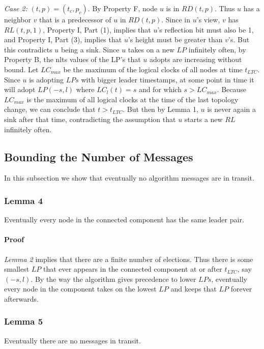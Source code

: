 \documentclass{article}
\begin{document}
\textit{Case 2:}
$(t, p) = (t_c, p_c)$. By Property F, node $u$ is in $RD(t, p)$. Thus $u$ has a neighbor $v$ that is a predecessor of $u$ in $RD(t, p)$. Since in $u$’s view, $v$ has $RL(t, p, 1)$, Property I, Part (1), implies that $u$’s reflection bit must also be 1, and Property I, Part (3), implies that $u$’s height must be greater than $v$’s. But this contradicts $u$ being a sink. Since $u$ takes on a new $LP$ infinitely often, by Property
B, the nlts values of the LP’s that $u$ adopts are increasing without bound. Let $LC_{max}$ be the maximum of the logical clocks of all nodes at time $t_{LTC}$. Since $u$ is adopting $LPs$ with bigger leader timestamps, at some point in time it will adopt $LP(−s, l)$ where $LC_l(t) = s$ and for which $s > LC_{max}$.
Because $LC_{max}$ is the maximum of all logical clocks at the time of the last topology change, we can conclude that $t > t_{LTC}$. But then by Lemma 1, $u$ is never again a sink after that time, contradicting the assumption that $u$ starts a new $RL$ infinitely often.

\subsection{Bounding the Number of Messages}
In this subsection we show that eventually no algorithm messages are in transit.

\subsubsection{Lemma 4}
Eventually every node in the connected component has the same leader pair.

\paragraph{Proof}
\textit{Lemma 2} implies that there are a finite number of elections. Thus there is some smallest $LP$ that ever appears in the connected component at or after $t_{LTC}$, say $(−s, l)$.
By the way the algorithm gives precedence to lower $LPs$, eventually every node in the component takes on the lowest $LP$ and keeps that $LP$ forever afterwards.

\subsubsection{Lemma 5}
Eventually there are no messages in transit.
\end{document}

